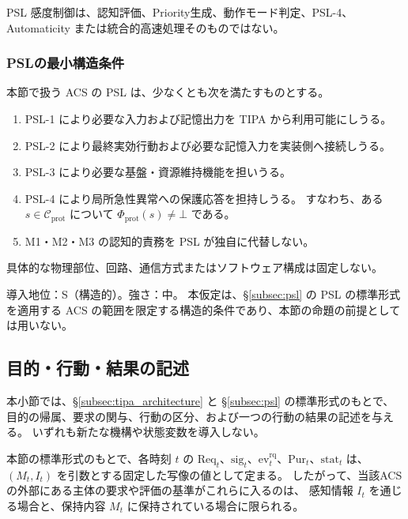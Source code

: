 \begin{remark}[感度制御の非認知性]
\label{rem:sensitivity_noncognitive}
PSL 感度制御は、認知評価、Priority生成、動作モード判定、PSL-4、
Automaticity または統合的高速処理そのものではない。
\end{remark}

\subsubsection{PSLの最小構造条件}
\label{subsubsec:psl_minimal_conditions}

\begin{assumption}[PSLの最小構造条件と非認知性]
\label{ass:psl_minimal}
本節で扱う ACS の PSL は、少なくとも次を満たすものとする。
\begin{enumerate}
  \item PSL-1 により必要な入力および記憶出力を TIPA から利用可能にしうる。
  \item PSL-2 により最終実効行動および必要な記憶入力を実装側へ接続しうる。
  \item PSL-3 により必要な基盤・資源維持機能を担いうる。
  \item PSL-4 により局所急性異常への保護応答を担持しうる。
  すなわち、ある $s\in\mathcal C_{\mathrm{prot}}$ について $\Phi_{\mathrm{prot}}(s)\neq\bot$ である。
  \item M1・M2・M3 の認知的責務を PSL が独自に代替しない。
\end{enumerate}
具体的な物理部位、回路、通信方式またはソフトウェア構成は固定しない。

導入地位：S（構造的）。強さ：中。
本仮定は、\S\ref{subsec:psl} の PSL の標準形式を適用する ACS の範囲を限定する構造的条件であり、本節の命題の前提としては用いない。
\end{assumption}

\subsection{目的・行動・結果の記述}
\label{subsec:purpose_action_result}

本小節では、\S\ref{subsec:tipa_architecture} と \S\ref{subsec:psl} の標準形式のもとで、
目的の帰属、要求の関与、行動の区分、および一つの行動の結果の記述を与える。
いずれも新たな機構や状態変数を導入しない。

\begin{proposition}[目的の自己帰属性]
\label{prop:purpose_self_attribution}
本節の標準形式のもとで、各時刻 $t$ の
$\mathrm{Req}_t$、$\mathrm{sig}_t$、$\mathrm{ev}^{\mathrm{rq}}_t$、$\mathrm{Pur}_t$、$\mathrm{stat}_t$ は、
$(M_t,I_t)$ を引数とする固定した写像の値として定まる。
したがって、当該ACSの外部にある主体の要求や評価の基準がこれらに入るのは、
感知情報 $I_t$ を通じる場合と、保持内容 $M_t$ に保持されている場合に限られる。
\end{proposition}

